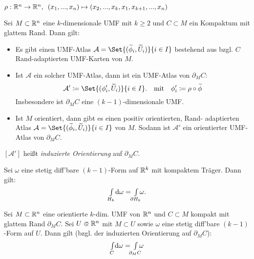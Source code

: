 \documentclass{cheat-sheet}
\newcommand{\Atlas}{\mathcal{A}} %
\theoremstyle{definition}
\newcommand{\Intdf}[2]{{\textstyle \int\limits_{#1}} #2} %
\begin{document}
\begin{nota}
  $\rho : \mathbb{R}^n \to \mathbb{R}^n, \enspace (x_1, ..., x_n) \mapsto (x_2, ..., x_k, x_1, x_{k+1}, ..., x_n)$
\end{nota}

\begin{lem}
  Sei $M \subset \mathbb{R}^n$ eine $k$-dimensionale UMF mit $k \geq 2$ und $C \subset M$ ein Kompaktum mit glattem Rand. Dann gilt:
  \begin{itemize}
    \item Es gibt einen UMF-Atlas $\Atlas = \Set{ (\widetilde{\phi}_i, \widetilde{U}_i) }{ i \in I }$ bestehend aus bzgl. $C$ Rand-adaptierten UMF-Karten von $M$.
    \item  Ist $\Atlas$ ein solcher UMF-Atlas, dann ist ein UMF-Atlas von $\partial_M C$:
    \[
      \Atlas' \coloneqq \Set{ (\phi_i', \widetilde{U}_i) }{ i \in I }.
      \quad \text{mit} \quad
      \phi_i' \coloneqq \rho \circ \widetilde{\phi}
    \]
    Insbesondere ist $\partial_M C$ eine $(k{-}1)$-dimensionale UMF.
    \item Ist $M$ orientiert, dann gibt es einen positiv orientierten, Rand- adaptierten Atlas $\Atlas = \Set{ (\widetilde{\phi}_i, \widetilde{U}_i) }{ i \in I }$ von $M$. Sodann ist $\Atlas'$ ein orientierter UMF-Atlas von $\partial_M C$.
  \end{itemize}
\end{lem}

\begin{defn}
   $[\Atlas']$ heißt \emph{induzierte Orientierung} auf $\partial_M C$.
\end{defn}


\begin{lem}
  Sei $\omega$ eine stetig diff'bare $(k{-}1)$-Form auf $\mathbb{R}^k$ mit kompaktem Träger. Dann gilt:
  \[ \Intdf{H_k}{\d \omega} = \, \Intdf{\mathclap{\partial H_k}}{\, \omega}. \]
\end{lem}

\begin{satz}
  Sei $M \subset \mathbb{R}^n$ eine orientierte $k$-dim. UMF von $\mathbb{R}^n$ und $C \subset M$ kompakt mit glattem Rand $\partial_M C$. Sei $U \opn \R^n$ mit $M \subset U$ sowie $\omega$ eine stetig diff'bare $(k{-}1)$-Form auf $U$. Dann gilt (bzgl. der induzierten Orientierung auf $\partial_M C$):
  \[ \Intdf{C}{\d \omega} = \, \Intdf{\mathclap{\partial_M C}}{\,\omega} \]
\end{satz}
\end{document}
